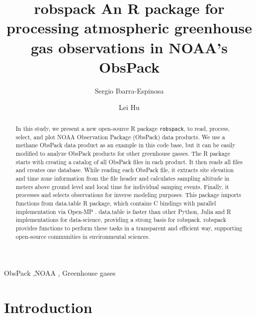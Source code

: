 \documentclass[preprint, 3p,
authoryear]{elsarticle} %
\begin{document}
\begin{frontmatter}

  \title{robspack An R package for processing atmospheric greenhouse gas
observations in NOAA's ObsPack}
    \author[a,b]{Sergio Ibarra-Espinosa%
  }
    \author[b]{Lei Hu%
  }
  
  \begin{abstract}
  In this study, we present a new open-source R package
  \texttt{robspack}, to read, process, select, and plot NOAA Observation
  Package (ObsPack) data products. We use a methane ObsPack data product
  as an example in this code base, but it can be easily modified to
  analyze ObsPack products for other greenhouse gasses. The R package
  starts with creating a catalog of all ObsPack files in each product.
  It then reads all files and creates one database. While reading each
  ObsPack file, it extracts site elevation and time zone information
  from the file header and calculates sampling altitude in meters above
  ground level and local time for individual samping events. Finally, it
  processes and selects observations for inverse modeling purposes. This
  package imports functions from data.table R package, which contains C
  bindings with parallel implementation via Open-MP \citep{dt}.
  data.table is faster than other Python, Julia and R implementations
  for data-science, providing a strong basis for robspack. robspack
  provides functions to perform these tasks in a transparent and
  efficient way, supporting open-source communities in environmental
  sciences.
  \end{abstract}
    \begin{keyword}
    ObsPack \sep NOAA \sep 
    Greenhouse gases
  \end{keyword}
  
 \end{frontmatter}

\hypertarget{introduction}{%
\section{Introduction}\label{introduction}}
\end{document}
